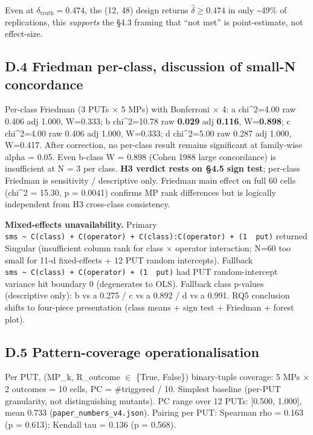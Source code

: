 \documentclass[acmsmall,screen,review]{acmart}
\begin{document}
Even at $\delta_{\mathrm{truth}} = 0.474$, the (12, 48) design returns $\hat{\delta} \geq
0.474$ in only \textasciitilde49\% of replications, this
\emph{supports} the §4.3 framing that ``not met'' is point-estimate, not
effect-size.

\subsection{D.4 Friedman per-class, discussion of small-N concordance}\label{d.4-friedman-per-class-discussion-of-small-n-concordance}

Per-class Friedman (3 PUTs $\times$ 5 MPs) with Bonferroni $\times$ 4: a chi\^{}2=4.00
raw 0.406 adj 1.000, W=0.333; b chi\^{}2=10.78 raw \textbf{0.029} adj
\textbf{0.116}, W=\textbf{0.898}; c chi\^{}2=4.00 raw 0.406 adj 1.000,
W=0.333; d chi\^{}2=5.00 raw 0.287 adj 1.000, W=0.417. After correction,
no per-class result remains significant at family-wise alpha = 0.05.
Even b-class W = 0.898 (Cohen 1988 large concordance) is insufficient at
N = 3 per class. \textbf{H3 verdict rests on §4.5 sign test}; per-class
Friedman is sensitivity / descriptive only. Friedman main effect on full
60 cells (chi\^{}2 = 15.30, p = 0.0041) confirms MP rank differences but
is logically independent from H3 cross-class consistency.

\textbf{Mixed-effects unavailability.} Primary
\texttt{sms\ \textasciitilde{}\ C(class)\ +\ C(operator)\ +\ C(class):C(operator)\ +\ (1\ \textbar{}\ put)}
returned Singular (insufficient column rank for class $\times$ operator
interaction; N=60 too small for 11-d fixed-effects + 12 PUT random
intercepts). Fallback
\texttt{sms\ \textasciitilde{}\ C(class)\ +\ C(operator)\ +\ (1\ \textbar{}\ put)}
had PUT random-intercept variance hit boundary 0 (degenerates to OLS).
Fallback class p-values (descriptive only): b vs a 0.275 / c vs a 0.892
/ d vs a 0.991. RQ5 conclusion shifts to four-piece presentation (class
means + sign test + Friedman + forest plot).

\subsection{D.5 Pattern-coverage operationalisation}\label{d.5-pattern-coverage-operationalisation}

Per PUT, (MP\_k, R\_outcome $\in$ \{True, False\}) binary-tuple coverage: 5
MPs $\times$ 2 outcomes = 10 cells, PC = \#triggered / 10. Simplest baseline
(per-PUT granularity, not distinguishing mutants). PC range over 12
PUTs: {[}0.500, 1.000{]}, mean 0.733 (\texttt{paper\_numbers\_v4.json}).
Pairing per PUT: Spearman rho = 0.163 (p = 0.613); Kendall tau = 0.136
(p = 0.568).
\end{document}
